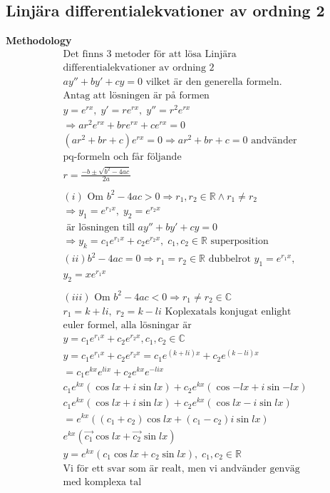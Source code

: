 \begin{multicols}{2}
\subsection{Linjära differentialekvationer av ordning 2}
\textbf{Methodology}  
\begin{align*}
  &\text{Det finns 3 metoder för att lösa Linjära} \\
  &\text{differentialekvationer av ordning 2} \\
  &ay'' + by' +cy = 0 \text{ vilket är den generella formeln.} \\
  &\text{Antag att lösningen är på formen} \\
  &y=e^{rx}, \; y'=re^{rx}, \; y''=r^2e^{rx} \\
  &\Rightarrow ar^2e^{rx} + bre^{rx} + ce^{rx} = 0 \\
  &(ar^2+br+c)e^{rx}=0 \Rightarrow ar^2+br+c=0 \text{ andvänder} \\
  &\text{pq-formeln och får följande } \\
  &r= \frac{-b\pm\sqrt{b^2-4ac}}{2a} \\
  &\\
  &(i) \text{ Om } b^2-4ac > 0 \Rightarrow r_1,r_2\in\mathbb{R} \land r_1\neq r_2  \\
  &\Rightarrow y_1=e^{r_1x}, \; y_2=e^{r_2x} \\
  &\text{ är lösningen till }  ay'' + by' +cy = 0 \\
  &\Rightarrow y_k=c_1e^{r_1x} + c_2e^{r_2x},\; c_1,c_2\in\mathbb{R} \text{ superposition}
  &\\
  &(ii) b^2-4ac=0 \Rightarrow r_1=r_2\in\mathbb{R} \text{ dubbelrot } y_1=e^{r_1x}, \\
  &y_2=xe^{r_1x} \\
  &\\
  &(iii) \text{ Om } b^2-4ac<0 \Rightarrow r_1\neq r_2 \in\mathbb{C}  \\
  &r_1=k+li, \; r_2=k-li  \text{ Koplexatals konjugat enlight} \\
  &\text{euler formel, alla lösningar är} \\
  &y=c_1e^{r_1x} + c_2e^{r_2x}, c_1,c_2 \in\mathbb{C}  \\
  &y=c_1e^{r_1x} + c_2e^{r_2x}=c_1e^{(k+li)x} + c_2e^{(k-li)x} \\
  &= c_1e^{kx}e^{lix} + c_2e^{kx}e^{-lix} \\
  &c_1e^{kx}(\cos{lx} + i\sin{lx}) + c_2e^{kx}(\cos{-lx} + i\sin{-lx}) \\
  &c_1e^{kx}(\cos{lx} + i\sin{lx}) + c_2e^{kx}(\cos{lx} - i\sin{lx}) \\
  &=e^{kx}((c_1+c_2)\cos{lx} + (c_1-c_2)i\sin{lx}) \\
  &e^{kx}(\vec{c_1}\cos{lx} + \vec{c_2}\sin{lx}) \\
  &y = e^{kx}(c_1\cos{lx} + c_2\sin{lx}), \; c_1,c_2\in\mathbb{R} \\
  &\text{Vi för ett svar som är realt, men vi andvänder genväg} \\
  &\text{med komplexa tal}
\end{align*}



\end{multicols}
